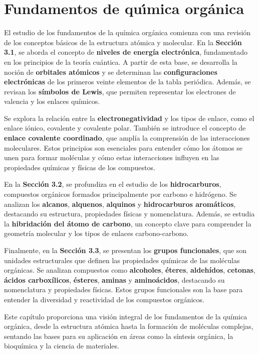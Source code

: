 \chapter{\textrm{Fundamentos de qu\'{\i}mica org\'anica}}
El estudio de los fundamentos de la química orgánica comienza con una revisión de los conceptos básicos de la estructura atómica y molecular. En la \textbf{Sección 3.1}, se aborda el concepto de \textbf{niveles de energía electrónica}, fundamentado en los principios de la teoría cuántica. A partir de esta base, se desarrolla la noción de \textbf{orbitales atómicos} y se determinan las \textbf{configuraciones electrónicas} de los primeros veinte elementos de la tabla periódica. Además, se revisan los \textbf{símbolos de Lewis}, que permiten representar los electrones de valencia y los enlaces químicos.

Se explora la relación entre la \textbf{electronegatividad} y los tipos de enlace, como el enlace iónico, covalente y covalente polar. También se introduce el concepto de \textbf{enlace covalente coordinado}, que amplía la comprensión de las interacciones moleculares. Estos principios son esenciales para entender cómo los átomos se unen para formar moléculas y cómo estas interacciones influyen en las propiedades químicas y físicas de los compuestos.

En la \textbf{Sección 3.2}, se profundiza en el estudio de los \textbf{hidrocarburos}, compuestos orgánicos formados principalmente por carbono e hidrógeno. Se analizan los \textbf{alcanos}, \textbf{alquenos}, \textbf{alquinos} y \textbf{hidrocarburos aromáticos}, destacando su estructura, propiedades físicas y nomenclatura. Además, se estudia la \textbf{hibridación del átomo de carbono}, un concepto clave para comprender la geometría molecular y los tipos de enlaces carbono-carbono.

Finalmente, en la \textbf{Sección 3.3}, se presentan los \textbf{grupos funcionales}, que son unidades estructurales que definen las propiedades químicas de las moléculas orgánicas. Se analizan compuestos como \textbf{alcoholes}, \textbf{éteres}, \textbf{aldehídos}, \textbf{cetonas}, \textbf{ácidos carboxílicos}, \textbf{ésteres}, \textbf{aminas} y \textbf{aminoácidos}, destacando su nomenclatura y propiedades físicas. Estos grupos funcionales son la base para entender la diversidad y reactividad de los compuestos orgánicos.

Este capítulo proporciona una visión integral de los fundamentos de la química orgánica, desde la estructura atómica hasta la formación de moléculas complejas, sentando las bases para su aplicación en áreas como la síntesis orgánica, la bioquímica y la ciencia de materiales.

